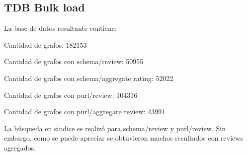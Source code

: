 \subsection{TDB Bulk load}

La base de datos resultante contiene:

Cantidad de grafos: 182153

Cantidad de grafos con schema/review: 50955 

Cantidad de grafos con schema/aggregate rating: 52022

Cantidad de grafos con purl/review: 104316 

Cantidad de grafos con purl/aggregate review: 43991

La búsqueda en sindice se realizó para schema/review y purl/review. Sin embargo, como se puede apreciar se obtuvieron muchos resultados con reviews agregados.
